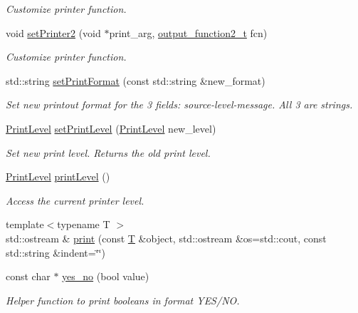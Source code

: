 \begin{DoxyCompactItemize}
\begin{DoxyCompactList}\small\item\em Customize printer function. \end{DoxyCompactList}\item 
void \hyperlink{namespace_d_d4hep_a5109e91adaa5c7b3de87e2f53291ff64}{set\+Printer2} (void $\ast$print\+\_\+arg, \hyperlink{namespace_d_d4hep_a932f25438e2e68169d1a82ff99301873}{output\+\_\+function2\+\_\+t} fcn)
\begin{DoxyCompactList}\small\item\em Customize printer function. \end{DoxyCompactList}\item 
std\+::string \hyperlink{namespace_d_d4hep_af513a6bf27ce12f7b69458e218bcdede}{set\+Print\+Format} (const std\+::string \&new\+\_\+format)
\begin{DoxyCompactList}\small\item\em Set new printout format for the 3 fields\+: source-\/level-\/message. All 3 are strings. \end{DoxyCompactList}\item 
\hyperlink{namespace_d_d4hep_a5b5a64d56252469451f2020a27d57d42}{Print\+Level} \hyperlink{namespace_d_d4hep_a01aab75bd90e7887aaec1fbf3b4eb03d}{set\+Print\+Level} (\hyperlink{namespace_d_d4hep_a5b5a64d56252469451f2020a27d57d42}{Print\+Level} new\+\_\+level)
\begin{DoxyCompactList}\small\item\em Set new print level. Returns the old print level. \end{DoxyCompactList}\item 
\hyperlink{namespace_d_d4hep_a5b5a64d56252469451f2020a27d57d42}{Print\+Level} \hyperlink{namespace_d_d4hep_abdbd705fe59353c8596e4ad5b7355814}{print\+Level} ()
\begin{DoxyCompactList}\small\item\em Access the current printer level. \end{DoxyCompactList}\item 
{\footnotesize template$<$typename T $>$ }\\std\+::ostream \& \hyperlink{namespace_d_d4hep_a373ecb4c3eb0d0e6f3620bbc856a658b}{print} (const \hyperlink{class_t}{T} \&object, std\+::ostream \&os=std\+::cout, const std\+::string \&indent=\char`\"{}\char`\"{})
\item 
const char $\ast$ \hyperlink{namespace_d_d4hep_a9b6e2c5ab00340e93017e18604b0cb85}{yes\+\_\+no} (bool value)
\begin{DoxyCompactList}\small\item\em Helper function to print booleans in format Y\+E\+S/\+NO. \end{DoxyCompactList}\item 

\end{DoxyCompactItemize}
